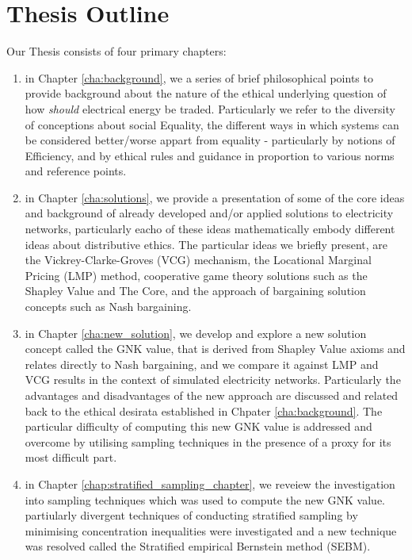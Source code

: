 \section*{Thesis Outline}
Our Thesis consists of four primary chapters:
\begin{enumerate}
\item in Chapter \ref{cha:background}, we a series of brief philosophical points to provide background about the nature of the ethical underlying question of how \textit{should} electrical energy be traded. Particularly we refer to the diversity of conceptions about social Equality, the different ways in which systems can be considered better/worse appart from equality - particularly by notions of Efficiency, and by ethical rules and guidance in proportion to various norms and reference points. 
\item in Chapter \ref{cha:solutions}, we provide a presentation of some of the core ideas and background of already developed and/or applied solutions to electricity networks, particularly eacho of these ideas mathematically embody different ideas about distributive ethics. The particular ideas we briefly present, are the Vickrey-Clarke-Groves (VCG) mechanism, the Locational Marginal Pricing (LMP) method, cooperative game theory solutions such as the Shapley Value and The Core, and the approach of bargaining solution concepts such as Nash bargaining. 
\item in Chapter \ref{cha:new_solution}, we develop and explore a new solution concept called the GNK value, that is derived from Shapley Value axioms and relates directly to Nash bargaining, and we compare it against LMP and VCG results in the context of simulated electricity networks. Particularly the advantages and disadvantages of the new approach are discussed and related back to the ethical desirata established in Chpater \ref{cha:background}. The particular difficulty of computing this new GNK value is addressed and overcome by utilising sampling techniques in the presence of a proxy for its most difficult part.
\item in Chapter \ref{chap:stratified_sampling_chapter}, we reveiew the investigation into sampling techniques which was used to compute the new GNK value. partiularly divergent techniques of conducting stratified sampling by minimising concentration inequalities were investigated and a new technique was resolved called the Stratified empirical Bernstein method (SEBM).
\end{enumerate}

